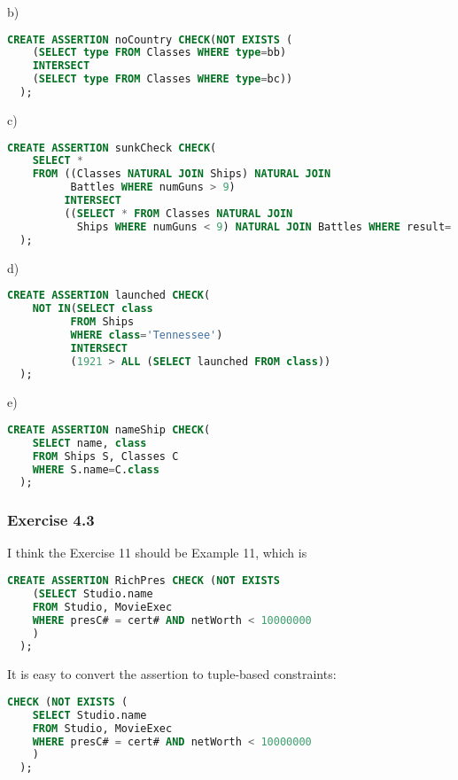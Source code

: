 \documentclass[../../main.tex]{subfiles}
\begin{document}
b)

\begin{lstlisting}[language=sql]
  CREATE ASSERTION noCountry CHECK(NOT EXISTS (
    (SELECT type FROM Classes WHERE type=bb)
    INTERSECT
    (SELECT type FROM Classes WHERE type=bc))
  );
\end{lstlisting}

c)

\begin{lstlisting}[language=sql]
  CREATE ASSERTION sunkCheck CHECK(
    SELECT *
    FROM ((Classes NATURAL JOIN Ships) NATURAL JOIN
          Battles WHERE numGuns > 9)
         INTERSECT
         ((SELECT * FROM Classes NATURAL JOIN
           Ships WHERE numGuns < 9) NATURAL JOIN Battles WHERE result='sunk')
  );
\end{lstlisting}

d)

\begin{lstlisting}[language=sql]
  CREATE ASSERTION launched CHECK(
    NOT IN(SELECT class
          FROM Ships
          WHERE class='Tennessee')
          INTERSECT
          (1921 > ALL (SELECT launched FROM class))
  );
\end{lstlisting}

e)

\begin{lstlisting}[language=sql]
  CREATE ASSERTION nameShip CHECK(
    SELECT name, class
    FROM Ships S, Classes C
    WHERE S.name=C.class
  );
\end{lstlisting}

\subsubsection*{Exercise 4.3}

I think the Exercise 11 should be Example 11, which is

\begin{lstlisting}[language=sql]
  CREATE ASSERTION RichPres CHECK (NOT EXISTS
    (SELECT Studio.name
    FROM Studio, MovieExec
    WHERE presC# = cert# AND netWorth < 10000000
    )
  );
\end{lstlisting}

It is easy to convert the assertion to tuple-based constraints:

\begin{lstlisting}[language=sql]
  CHECK (NOT EXISTS (
    SELECT Studio.name
    FROM Studio, MovieExec
    WHERE presC# = cert# AND netWorth < 10000000
    )
  );
\end{lstlisting}
\end{document}
